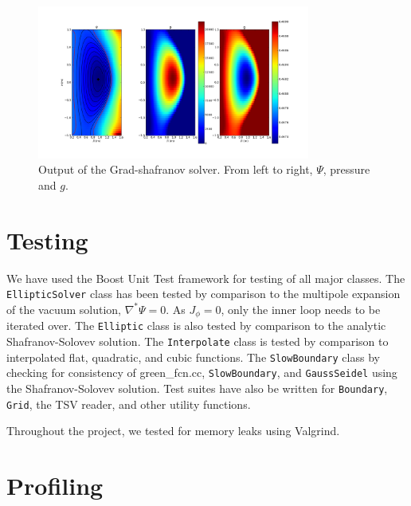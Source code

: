 \documentclass[paper=letter, fontsize=11pt]{scrartcl} %
\begin{document}
\begin{figure}
	\centering
	\includegraphics[width=0.8\textwidth]{eqm}
	\caption{Output of the Grad-shafranov solver. From left to right, $\Psi$, pressure and $g$. }
	\label{fig:eqm}
\end{figure}



\section{Testing}

We have used the Boost Unit Test framework for testing of all major classes. The \texttt{EllipticSolver} class has been tested by comparison to the multipole expansion of the vacuum solution, $\nabla^* \Psi = 0$. As $J_{\phi} = 0$, only the inner loop needs to be iterated over. The \texttt{Elliptic} class is also tested by comparison to the analytic Shafranov-Solovev solution. The \texttt{Interpolate} class is tested by comparison to interpolated flat, quadratic, and cubic functions. The \texttt{SlowBoundary} class by checking for consistency of green\_fcn.cc, \texttt{SlowBoundary}, and \texttt{GaussSeidel} using the Shafranov-Solovev solution. Test suites have also be written for \texttt{Boundary}, \texttt{Grid}, the TSV reader, and other utility functions.

Throughout the project, we tested for memory leaks using Valgrind.


\section{Profiling}
\end{document}
